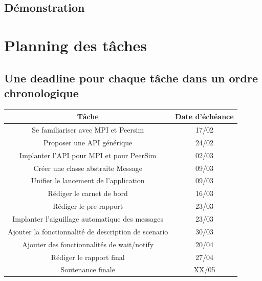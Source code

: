 \documentclass{article}
\begin{document}
		\subsection{Démonstration}
		\section{Planning des tâches}
			\subsection{Une deadline pour chaque tâche dans un ordre chronologique}
			\begin{tabular}{|c|c|}
				\hline
				Tâche & Date d'échéance \\[1mm]
				\hline
				Se familiariser avec MPI et Peersim & 17/02 \\[1mm]
				\hline
				Proposer une API générique & 24/02 \\[1mm]
				\hline
				Implanter l'API pour MPI et pour PeerSim & 02/03 \\[1mm]
				\hline
				Créer une classe abstraite Message & 09/03 \\[1mm]
				\hline
				Unifier le lancement de l'application & 09/03 \\[1mm]
				\hline
				Rédiger le carnet de bord & 16/03 \\[1mm]
				\hline
				Rédiger le pre-rapport & 23/03 \\[1mm]
				\hline 
				Implanter l'aiguillage automatique des messages & 23/03 \\[1mm]
				\hline
				Ajouter la fonctionnalité de description de scenario & 30/03 \\[1mm]
				\hline
				Ajouter des fonctionnalités de wait/notify & 20/04 \\[1mm]
				\hline 
				Rédiger le rapport final & 27/04 \\[1mm]
				\hline
				Soutenance finale & XX/05 \\[1mm]
				\hline
			\end{tabular}
\end{document}
